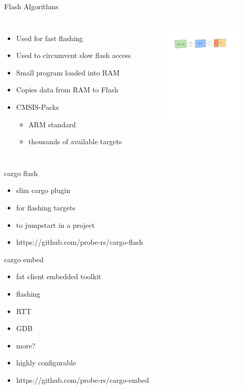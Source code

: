 \documentclass[aspectratio=1610,14pt,t]{beamer}
\begin{document}
\begin{frame}[c,fragile]{Flash Algorithms}
  \begin{columns}[t,onlytextwidth]
    \begin{itemize}
      \item Used for fast flashing
      \item Used to circumvent slow flash access
      \item Small program loaded into RAM
      \item Copies data from RAM to Flash
      \item CMSIS-Packs
      \begin{itemize}
        \item ARM standard
        \item thousands of available targets
      \end{itemize}
    \end{itemize}
    \begin{figure}
      \includegraphics[width=4cm]{./img/probe-chain.pdf}
    \end{figure}
  \end{columns}
\end{frame}

\begin{frame}[c,fragile]{cargo flash}
  \begin{itemize}
    \item slim cargo plugin
    \item for flashing targets
    \item to jumpstart in a project
    \item https://github.com/probe-rs/cargo-flash
  \end{itemize}
\end{frame}

\begin{frame}[c,fragile]{cargo embed}
  \begin{itemize}
    \item fat client embedded toolkit
    \item flashing
    \item RTT
    \item GDB
    \item more?
    \item highly configurable
    \item https://github.com/probe-rs/cargo-embed
  \end{itemize}
\end{frame}
\end{document}

